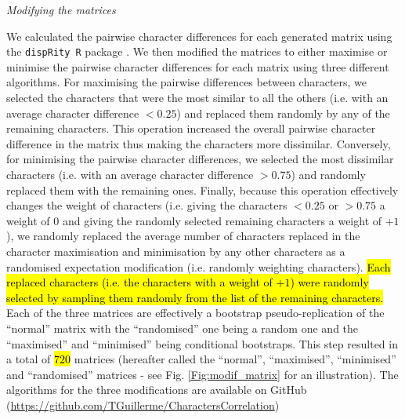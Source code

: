 \documentclass[12pt,letterpaper]{article}
\renewcommand{\subsection}[1]{%
\bigskip
\begin{center}
\begin{large}
\normalfont\itshape #1
\end{large}
\end{center}}
\begin{document}
\subsection{Modifying the matrices}
We calculated the pairwise character differences for each generated matrix using the \texttt{dispRity R} package \citep{thomas_guillerme_2016_55646}.
We then modified the matrices to either maximise or minimise the pairwise character differences for each matrix using three different algorithms.
For maximising the pairwise differences between characters, we selected the characters that were the most similar to all the others (i.e. with an average character difference $<0.25$) and replaced them randomly by any of the remaining characters.
This operation increased the overall pairwise character difference in the matrix thus making the characters more dissimilar.
Conversely, for minimising the pairwise character differences, we selected the most dissimilar characters (i.e. with an average character difference $>0.75$) and randomly replaced them with the remaining ones.
Finally, because this operation effectively changes the weight of characters (i.e. giving the characters $<0.25$ or $>0.75$ a weight of $0$ and giving the randomly selected remaining characters a weight of +$1$), we randomly replaced the average number of characters replaced in the character maximisation and minimisation by any other characters as a randomised expectation modification (i.e. randomly weighting characters).
\hl{Each replaced characters (i.e. the characters with a weight of +$1$) were randomly selected by sampling them randomly from the list of the remaining characters.}
Each of the three matrices are effectively a bootstrap pseudo-replication of the ``normal'' matrix with the ``randomised'' one being a random one and the ``maximised'' and ``minimised'' being conditional bootstraps.
This step resulted in a total of \hl{720} matrices (hereafter called the ``normal'', ``maximised'', ``minimised'' and ``randomised'' matrices - see Fig. \ref{Fig:modif_matrix} for an illustration).
The algorithms for the three modifications are available on GitHub (\url{https://github.com/TGuillerme/CharactersCorrelation})
\end{document}
